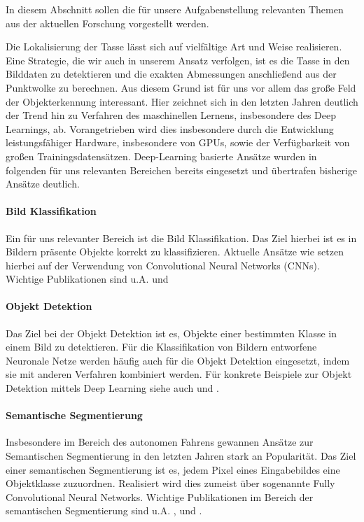 In diesem Abschnitt sollen die für unsere Aufgabenstellung relevanten Themen aus der aktuellen Forschung vorgestellt werden.

Die Lokalisierung der Tasse lässt sich auf vielfältige Art und Weise realisieren. Eine Strategie, die wir auch in unserem Ansatz verfolgen, ist es die Tasse in den Bilddaten zu detektieren und die exakten Abmessungen anschließend aus der Punktwolke zu berechnen. Aus diesem Grund ist für uns vor allem das große Feld der Objekterkennung interessant. Hier zeichnet sich in den letzten Jahren deutlich der Trend hin zu Verfahren des maschinellen Lernens, insbesondere des Deep Learnings, ab. Vorangetrieben wird dies insbesondere durch die Entwicklung leistungsfähiger Hardware, insbesondere von GPUs, sowie der Verfügbarkeit von großen Trainingsdatensätzen. Deep-Learning basierte Ansätze wurden in folgenden für uns relevanten Bereichen bereits eingesetzt und übertrafen bisherige Ansätze deutlich.

\paragraph{Bild Klassifikation}
Ein für uns relevanter Bereich ist die Bild Klassifikation. Das Ziel hierbei ist es in Bildern präsente Objekte korrekt zu klassifizieren. Aktuelle Ansätze wie setzen hierbei auf der Verwendung von Convolutional Neural Networks (CNNs). Wichtige Publikationen sind u.A. \cite{He.2016} und \cite{Szegedy.20151211}

\paragraph{Objekt Detektion}
Das Ziel bei der Objekt Detektion ist es, Objekte einer bestimmten Klasse in einem Bild zu detektieren. Für die Klassifikation von Bildern entworfene Neuronale Netze werden häufig auch für die Objekt Detektion eingesetzt, indem sie mit anderen Verfahren kombiniert werden. Für konkrete Beispiele zur Objekt Detektion mittels Deep Learning siehe auch \cite{Dai.20160621} und \cite{Ren.2017}. 

\paragraph{Semantische Segmentierung}
Insbesondere im Bereich des autonomen Fahrens gewannen Ansätze zur Semantischen Segmentierung in den letzten Jahren stark an Popularität. Das Ziel einer semantischen Segmentierung ist es, jedem Pixel eines Eingabebildes eine Objektklasse zuzuordnen. Realisiert wird dies zumeist über sogenannte Fully Convolutional Neural Networks. Wichtige Publikationen im Bereich der semantischen Segmentierung sind u.A. \cite{Shelhamer.2017}, \cite{Chen.2016} und \cite{Badrinarayanan.2017}.

